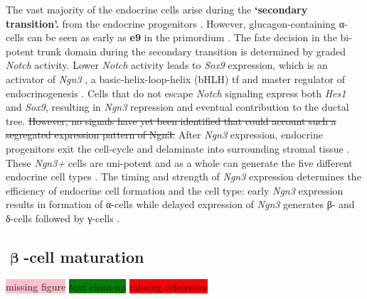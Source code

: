 The vast majority of the endocrine cells arise during the \textbf{`secondary transition'.} from the endocrine progenitors \textbf{\cite{pan_pancreas_2011}}. However, glucagon-containing α-cells can be seen as early as \textbf{e9} in the primordium \textbf{\cite{pictet_ultrastructural_1972,gittes_developmental_2009}}. The fate decision in the bi-potent trunk domain during the secondary transition is determined by graded \textit{Notch} activity. Lower \textit{Notch} activity leads to \textit{Sox9} expression, which is an activator of \textit{Ngn3} \textbf{\cite{shih_pancreas_2013}}, a basic-helix-loop-helix (bHLH) \gls{tf} and master regulator of endocrinogenesis \textbf{\cite{gu_direct_2002}}. Cells that do not escape \textit{Notch} signaling express both \textit{Hes1} and \textit{Sox9}, resulting in \textit{Ngn3} repression and eventual contribution to the ductal tree. \st{However, no signals have yet been identified that could account such a segregated expression pattern of Ngn3.} After \textit{Ngn3} expression, endocrine progenitors exit the cell-cycle and delaminate into surrounding stromal tissue \textbf{\cite{shih_pancreas_2013, gouzi_neurogenin3_2011, miyatsuka_neurogenin3_2011}}. These \textit{Ngn3+} cells are uni-potent and as a whole can generate the five different endocrine cell types \textbf{\cite{shih_pancreas_2013,gu_direct_2002,miyatsuka_neurogenin3_2011}}. The timing and strength of \textit{Ngn3} expression determines the efficiency of endocrine cell formation and the cell type: early \textit{Ngn3} expression results in formation of α-cells while delayed expression of \textit{Ngn3}  generates β- and δ-cells followed by γ-cells \textbf{\cite{johansson_temporal_2007}}.

\clearpage

\subsection{\( \mathbf{\upbeta} \)-cell maturation} %
\label{sec:betamat}
\colorbox{pink}{missing figure} \colorbox{green}{text clean-up} \colorbox{red}{missing references}\\

